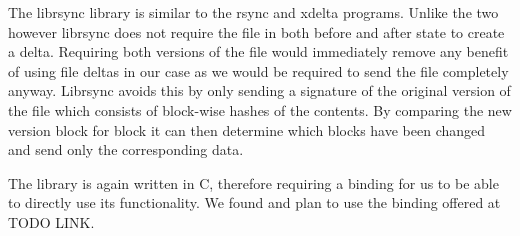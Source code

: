 The librsync library is similar to the rsync and xdelta programs.
Unlike the two however librsync does not require the file in both before and after state to create a delta.
Requiring both versions of the file would immediately remove any benefit of using file deltas in our case as we would be required to send the file completely anyway.
Librsync avoids this by only sending a signature of the original version of the file which consists of block-wise hashes of the contents.
By comparing the new version block for block it can then determine which blocks have been changed and send only the corresponding data.

The library is again written in C, therefore requiring a binding for us to be able to directly use its functionality.
We found and plan to use the binding offered at TODO LINK.
